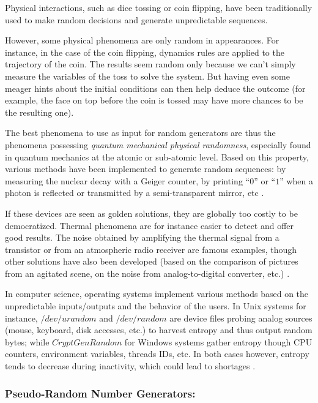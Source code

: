 \documentclass{llncs}
\begin{document}
Physical interactions, such as dice tossing or coin flipping, have been traditionally used to make random decisions and generate unpredictable sequences.

However, some physical phenomena are only random in appearances. For instance, in the case of the coin flipping, dynamics rules are applied to the trajectory of the coin. The results seem random only because we can't simply measure the variables of the toss to solve the system. But having even some meager hints about the initial conditions can then help deduce the outcome (for example, the face on top before the coin is tossed may have more chances to be the resulting one).

The best phenomena to use as input for random generators are thus the phenomena possessing \emph{quantum mechanical physical randomness}, especially found in quantum mechanics at the atomic or sub-atomic level. Based on this property, various methods have been implemented to generate random sequences: by measuring the nuclear decay with a Geiger counter, by printing “$0$” or “$1$” when a photon is reflected or transmitted by a semi-transparent mirror, etc \cite{w-rng,down}.

If these devices are seen as golden solutions, they are globally too costly to be democratized. Thermal phenomena are for instance easier to detect and offer good results. The noise obtained by amplifying the thermal signal from a transistor or from an atmospheric radio receiver are famous examples, though other solutions have also been developed (based on the comparison of pictures from an agitated scene, on the noise from analog-to-digital converter, etc.) \cite{w-rng}.

In computer science, operating systems implement various methods based on the unpredictable inputs/outputs and the behavior of the users. In Unix systems for instance, $/dev/urandom$ and $/dev/random$ are device files probing analog sources (mouse, keyboard, disk accesses, etc.) to harvest entropy and thus output random bytes; while $CryptGenRandom$ for Windows systems gather entropy though CPU counters, environment variables, threads IDs, etc. In both cases however, entropy tends to decrease during inactivity, which could lead to shortages \cite{auma}.

\subsubsection{Pseudo-Random Number Generators:}
\end{document}
